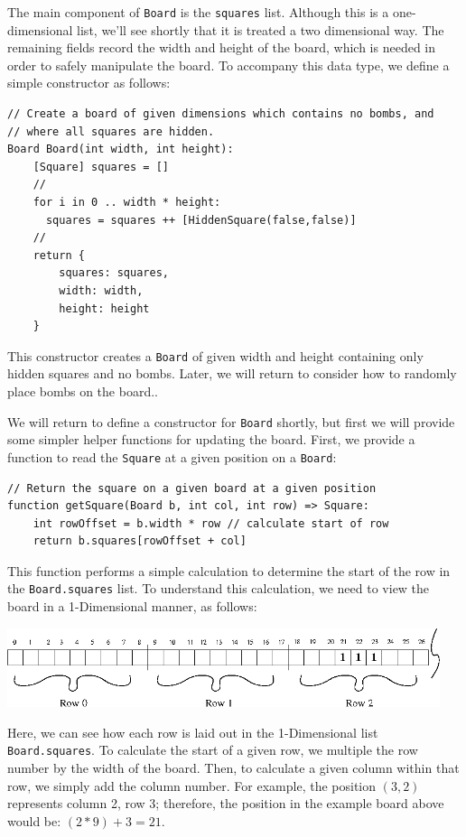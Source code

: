 The main component of \lstinline{Board} is the \lstinline{squares} list.  Although this is a one-dimensional list, we'll see shortly that it is treated a two dimensional way.  The remaining fields record the width and height of the board, which is needed in order to safely manipulate the board.  To accompany this data type, we define a simple constructor as follows:
\begin{lstlisting}
// Create a board of given dimensions which contains no bombs, and
// where all squares are hidden.
Board Board(int width, int height):
    [Square] squares = []
    //
    for i in 0 .. width * height:
      squares = squares ++ [HiddenSquare(false,false)]
    //
    return {
        squares: squares,
        width: width,
        height: height
    }
\end{lstlisting}
This constructor creates a \lstinline{Board} of given width and height containing only hidden squares and no bombs.  Later, we will return to consider how to randomly place bombs on the board..

We will return to define a constructor for \lstinline{Board} shortly, but first we will provide some simpler helper functions for updating the board.  First, we provide a function to read the \lstinline{Square} at a given position on a \lstinline{Board}:

\begin{lstlisting}
// Return the square on a given board at a given position
function getSquare(Board b, int col, int row) => Square:
    int rowOffset = b.width * row // calculate start of row
    return b.squares[rowOffset + col]
\end{lstlisting}

This function performs a simple calculation to determine the start of the row in the \lstinline{Board.squares} list.  To understand this calculation, we need to view the board in a 1-Dimensional manner, as follows:

\begin{center}
\includegraphics[width=0.95\textwidth]{../images/kmines_flat.png}
\end{center}

Here, we can see how each row is laid out in the 1-Dimensional list \lstinline{Board.squares}.  To calculate the start of a given row, we multiple the row number by the width of the board.  Then, to calculate a given column within that row, we simply add the column number.  For example, the position $(3,2)$ represents column 2, row 3; therefore, the position in the example board above would be: $(2 * 9) + 3 = 21$.

